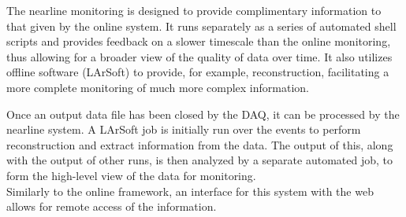 The nearline monitoring is designed to provide complimentary information to
that given by the online system. It runs separately as a series of automated
shell scripts and provides feedback on a slower timescale than the online
monitoring, thus allowing for a broader view of the quality of data over time.
It also utilizes offline software (LArSoft) to provide, for example,
reconstruction, facilitating a more complete monitoring of much more complex
information.

Once an output data file has been closed by the DAQ, it can be processed by the
nearline system.  A LArSoft job is initially run over the events to perform
reconstruction and extract information from the data.  The output of this,
along with the output of other runs, is then analyzed by a separate automated
job, to form the high-level view of the data for monitoring.\\
%
Similarly to the online framework, %
an interface for this system
with the web allows for remote access of the information.


